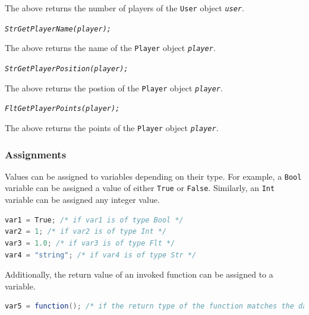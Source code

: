 \documentclass[12pt]{report}
\begin{document}
The above returns the number of players of the \texttt{User} object \textit{\texttt{user}}.

\begin{alltt}\begin{singlespace}
            \textit{Str GetPlayerName(player);}\end{singlespace}
\end{alltt}

The above returns the name of the \texttt{Player} object \textit{\texttt{player}}.

\begin{alltt}\begin{singlespace}
            \textit{Str GetPlayerPosition(player);}\end{singlespace}
\end{alltt}

The above returns the postion of the \texttt{Player} object \textit{\texttt{player}}.

\begin{alltt}\begin{singlespace}
            \textit{Flt GetPlayerPoints(player);}\end{singlespace}
\end{alltt}

The above returns the points of the \texttt{Player} object \textit{\texttt{player}}.

\subsubsection{Assignments}

Values can be assigned to variables depending on their type. For example,  a \texttt{Bool} variable can be assigned a value of either \texttt{True} or \texttt{False}. Similarly, an \texttt{Int} variable can be assigned any integer value. 

\begin{singlespace}
\begin{lstlisting}[language=Java,label=some-code,caption={Assignments}]
var1 = True; /* if var1 is of type Bool */
var2 = 1; /* if var2 is of type Int */
var3 = 1.0; /* if var3 is of type Flt */
var4 = "string"; /* if var4 is of type Str */
\end{lstlisting}
\end{singlespace}

Additionally, the return value of an invoked function can be assigned to a variable.

\begin{singlespace}
\begin{lstlisting}[language=Java,label=some-code,caption={Function assignment.}]
var5 = function(); /* if the return type of the function matches the data type of var5 */
\end{lstlisting}
\end{singlespace}
\end{document}

